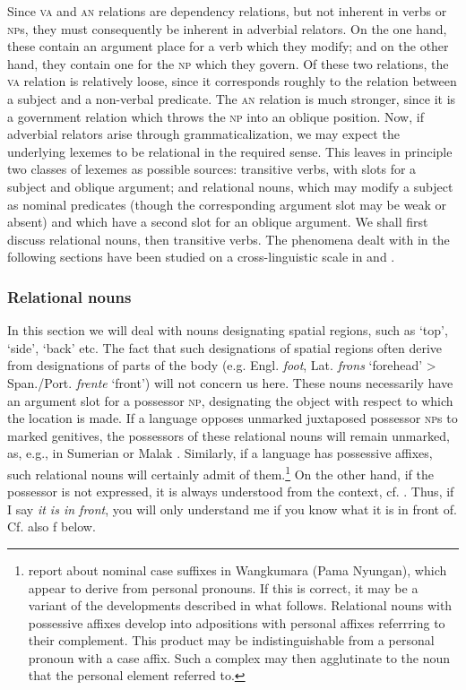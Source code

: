 Since \textsc{va} and \textsc{an} relations are dependency relations, but not inherent in verbs or \textsc{np}s, they must consequently be inherent in adverbial relators. On the one hand, these contain an argument place for a verb which they modify; and on the other hand, they contain one for the \textsc{np} which they govern. Of these two relations, the \textsc{va} relation is relatively loose, since it corresponds roughly to the relation between a subject and a non-verbal predicate. The \textsc{an} relation is much stronger, since it is a government relation which throws the \textsc{np} into an oblique position. Now, if adverbial relators arise through grammaticalization, we may expect the underlying lexemes to be relational in the required sense. This leaves in principle two classes of lexemes as possible sources: transitive verbs, with slots for a subject and oblique argument; and relational nouns, which may modify a subject as nominal predicates (though the corresponding argument slot may be weak or absent) and which have a second slot for an oblique argument. We shall first discuss relational nouns, then transitive verbs. The phenomena dealt with in the following sections have been studied on a cross-linguistic scale in \citealt{Kahr1975,Kahr1976} and \citealt[esp.~240]{Austerlitz1980}.

\subsubsection{Relational nouns}
In this section we will deal with nouns designating spatial regions, such as ‘top’, ‘side’, ‘back’ etc. The fact that such designations of spatial regions often derive from designations of parts of the body (e.g. Engl. \textit{foot}, Lat. \textit{frons} ‘forehead’ {\textgreater} Span./Port. \textit{frente} ‘front’) will not concern us here. These nouns necessarily have an argument slot for a possessor \textsc{np}, designating the object with respect to which the location is made. If a language opposes unmarked juxtaposed possessor \textsc{np}s to marked genitives, the possessors of these relational nouns will remain unmarked, as, e.g., in Sumerian or Malak \citep[389]{MallinsonEtAl1981}. Similarly, if a language has possessive affixes, such relational nouns will certainly admit of them.\footnote{\citet[50f]{MallinsonEtAl1981} report about nominal case suffixes in Wangkumara (Pama Nyungan), which appear to derive from personal pronouns. If this is correct, it may be a variant of the developments described in what follows. Relational nouns with possessive affixes develop into adpositions with personal affixes referrring to their complement. This product may be indistinguishable from a personal pronoun with a case affix. Such a complex may then agglutinate to the noun that the personal element referred to.} On the other hand, if the possessor is not expressed, it is always understood from the context, cf. \citealt[§~5.2.3.1]{Seiler1983}. Thus, if I say \textit{it is in front}, you will only understand me if you know what it is in front of. Cf. also f below.

